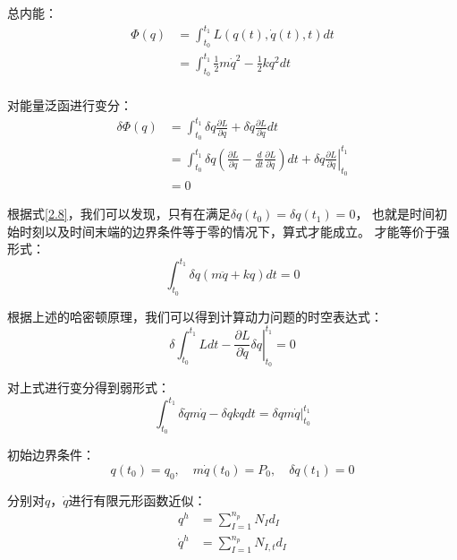 总内能：
\begin{equation}\label{2.7}
\begin{split}
\Phi(q) &= \int_{t_0}^{t_1} L(q(t),\dot q(t),t) dt\\
        &= \int_{t_0}^{t_1} \frac{1}{2}m\dot q^2 - \frac{1}{2}kq^2 dt\\ 
\end{split}
\end{equation}

对能量泛函进行变分：
\begin{equation}\label{2.8}
\begin{split}
\delta \Phi(q) &= \int_{t_0}^{t_1}\delta q \frac{\partial L}{\partial q} + 
\delta \dot q \frac{\partial L}{\partial \dot q} dt \\ 
&= \int_{t_0}^{t_1}\delta q (\frac{\partial L}{\partial q} - \frac{d}{dt}\frac{\partial L}{\partial \dot q}) dt + 
\left . \delta q \frac{\partial L}{\partial \dot q} \right \vert_{t_0}^{t_1}  \\
&= 0
\end{split}
\end{equation}

根据式\ref{2.8}，我们可以发现，只有在满足$\delta q(t_0) = \delta q(t_1) = 0$，
也就是时间初始时刻以及时间末端的边界条件等于零的情况下，算式才能成立。
才能等价于强形式：
\begin{equation}\label{2.9}
\int_{t_0}^{t_1} \delta q (m \ddot q + kq) dt = 0
\end{equation}

根据上述的哈密顿原理，我们可以得到计算动力问题的时空表达式：
\begin{equation}\label{2.10}
\delta \int_{t_0}^{t_1} L dt - \left . \frac{\partial L}{\partial \dot q} \delta q \right \vert_{t_0}^{t_1} = 0
\end{equation}

对上式进行变分得到弱形式：
\begin{equation}\label{2.11}
\int_{t_0}^{t_1}\delta \dot q m \dot q - \delta qkq dt = \left . \delta qm\dot q \right \vert_{t_0}^{t_1}
\end{equation}

初始边界条件：
\begin{equation}\label{2.12}
q(t_0) = q_0,\quad m\dot q(t_0) = P_0,\quad \delta q(t_1) = 0
\end{equation}

分别对$q$，$\dot q$进行有限元形函数近似：
\begin{equation}\label{2.13}
\begin{split}
q^h &= \sum_{I=1}^{n_p} N_I d_I\\
\dot q^h &= \sum_{I=1}^{n_p} N_{I,t} d_I
\end{split}
\end{equation}

